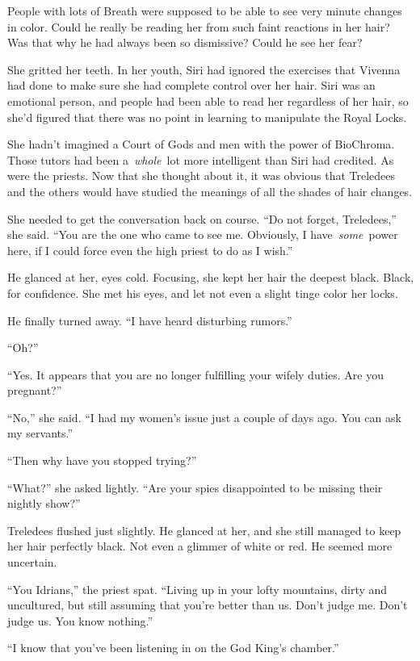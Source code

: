 People with lots of Breath were supposed to be able to see very minute changes in color. Could he really be reading her from such faint reactions in her hair? Was that why he had always been so dismissive? Could he see her fear?

She gritted her teeth. In her youth, Siri had ignored the exercises that Vivenna had done to make sure she had complete control over her hair. Siri was an emotional person, and people had been able to read her regardless of her hair, so she’d figured that there was no point in learning to manipulate the Royal Locks.

She hadn’t imagined a Court of Gods and men with the power of BioChroma. Those tutors had been a~\textit{whole}~lot more intelligent than Siri had credited. As were the priests. Now that she thought about it, it was obvious that Treledees and the others would have studied the meanings of all the shades of hair changes.

She needed to get the conversation back on course. “Do not forget, Treledees,” she said. “You are the one who came to see me. Obviously, I have~\textit{some}~power here, if I could force even the high priest to do as I wish.”

He glanced at her, eyes cold. Focusing, she kept her hair the deepest black. Black, for confidence. She met his eyes, and let not even a slight tinge color her locks.

He finally turned away. “I have heard disturbing rumors.”

“Oh?”

“Yes. It appears that you are no longer fulfilling your wifely duties. Are you pregnant?”

“No,” she said. “I had my women’s issue just a couple of days ago. You can ask my servants.”

“Then why have you stopped trying?”

“What?” she asked lightly. “Are your spies disappointed to be missing their nightly show?”

Treledees flushed just slightly. He glanced at her, and she still managed to keep her hair perfectly black. Not even a glimmer of white or red. He seemed more uncertain.

“You Idrians,” the priest spat. “Living up in your lofty mountains, dirty and uncultured, but still assuming that you’re better than us. Don’t judge me. Don’t judge us. You know nothing.”

“I know that you’ve been listening in on the God King’s chamber.”

